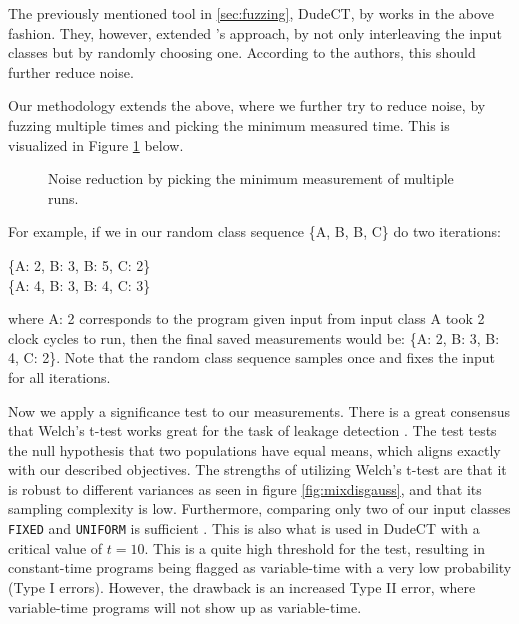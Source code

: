 The previously mentioned tool in \ref{sec:fuzzing}, DudeCT, by \citeauthor{dudect} works in the above fashion. They, however, extended \citeauthor{Coron_2004}'s approach, by not only interleaving the input classes but by randomly choosing one. According to the authors, this should further reduce noise.

Our methodology extends the above, where we further try to reduce noise, by fuzzing multiple times and picking the minimum measured time. This is visualized in Figure \ref{fig:noisered} below. 
\begin{figure}[H]
    \centering
    
    \caption{Noise reduction by picking the minimum measurement of multiple runs.}
    \label{fig:noisered}
\end{figure}
For example, if we in our random class sequence \{A, B, B, C\} do two iterations:
\begin{center}
    \{A: 2, B: 3, B: 5, C: 2\} \\
    \{A: 4, B: 3, B: 4, C: 3\}
\end{center}
where A: 2 corresponds to the program given input from input class A took 2 clock cycles to run, then the final saved measurements would be: \{A: 2, B: 3, B: 4, C: 2\}. Note that the random class sequence samples once and fixes the input for all iterations.

Now we apply a significance test to our measurements. There is a great consensus that Welch's t-test \citep{WELCH1947} works great for the task of leakage detection \citep{cryptoeprint:2015/536}.
The test tests the null hypothesis that two populations have equal means, which aligns exactly with our described objectives. The strengths of utilizing Welch's t-test are that it is robust to different variances as seen in figure \ref{fig:mixdisgauss}, and that its sampling complexity is low. Furthermore, comparing only two of our input classes \texttt{FIXED} and \texttt{UNIFORM} is sufficient \citep{Goodwill2011ATM}.
This is also what is used in DudeCT \citep{dudect} with a critical value of $t = 10$. 
This is a quite high threshold for the test, resulting in constant-time programs being flagged as variable-time with a very low probability (Type I errors).
However, the drawback is an increased Type II error, where variable-time programs will not show up as variable-time.

